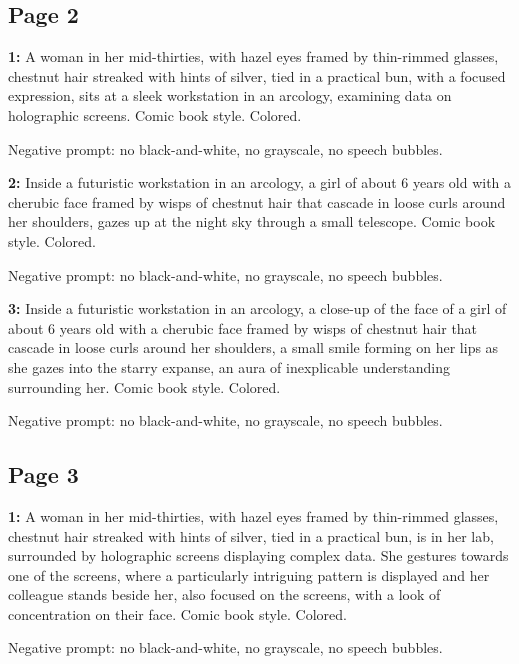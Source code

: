 \subsection*{Page 2}
\begin{iquote}
    \textbf{1:} A woman in her mid-thirties, with hazel eyes framed by thin-rimmed glasses, chestnut hair streaked with hints of silver, tied in a practical bun, with a focused expression, sits at a sleek workstation in an arcology, examining data on holographic screens. Comic book style. Colored.


    \noindent Negative prompt: no black-and-white, no grayscale, no speech bubbles.
\end{iquote}

\begin{iquote}
    \textbf{2:} Inside a futuristic workstation in an arcology, a girl of about 6 years old with a cherubic face framed by wisps of chestnut hair that cascade in loose curls around her shoulders, gazes up at the night sky through a small telescope. Comic book style. Colored.


    \noindent Negative prompt: no black-and-white, no grayscale, no speech bubbles.
\end{iquote}

\begin{iquote}
    \textbf{3:} Inside a futuristic workstation in an arcology, a close-up of the face of a girl of about 6 years old with a cherubic face framed by wisps of chestnut hair that cascade in loose curls around her shoulders, a small smile forming on her lips as she gazes into the starry expanse, an aura of inexplicable understanding surrounding her. Comic book style. Colored.


    \noindent Negative prompt: no black-and-white, no grayscale, no speech bubbles.
\end{iquote}


\subsection*{Page 3}
\begin{iquote}
    \textbf{1:} A woman in her mid-thirties, with hazel eyes framed by thin-rimmed glasses, chestnut hair streaked with hints of silver, tied in a practical bun, is in her lab, surrounded by holographic screens displaying complex data. She gestures towards one of the screens, where a particularly intriguing pattern is displayed and her colleague stands beside her, also focused on the screens, with a look of concentration on their face. Comic book style. Colored.

    \noindent Negative prompt: no black-and-white, no grayscale, no speech bubbles.
\end{iquote}

